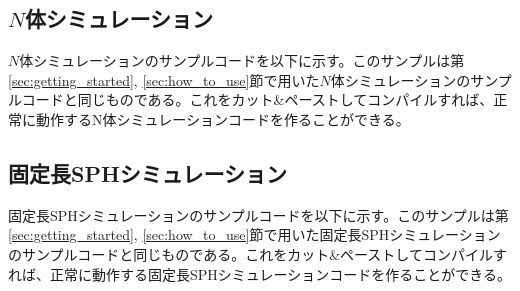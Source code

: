 \subsection{$N$体シミュレーション}

$N$体シミュレーションのサンプルコードを以下に示す。このサンプルは第\ref{sec:getting_started}, \ref{sec:how_to_use}節で用いた$N$体シミュレーションのサンプルコードと同じものである。これをカット\&ペーストしてコンパイルすれば、正常に動作するN体シミュレーションコードを作ることができる。

\ifCpp %


\endifCpp
\ifFtn %


\endifFtn
\ifC %



\endifC

\subsection{固定長SPHシミュレーション}

固定長SPHシミュレーションのサンプルコードを以下に示す。このサンプルは第\ref{sec:getting_started}, \ref{sec:how_to_use}節で用いた固定長SPHシミュレーションのサンプルコードと同じものである。これをカット\&ペーストしてコンパイルすれば、正常に動作する固定長SPHシミュレーションコードを作ることができる。

\ifCpp %

\endifCpp
\ifFtn %



\endifFtn
\ifC %



\endifC
